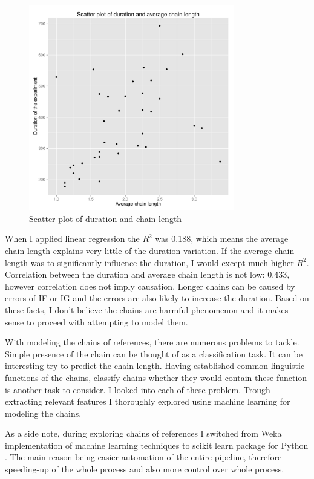 \begin{figure}[!htbp]
  \centering
	\includegraphics[width=0.8\textwidth]{Images/chains_duration_LR}
	\caption{Scatter plot of duration and chain length}
	\label{fig:chains_dur_scatter}
\end{figure}

When I applied linear regression the $R^2$ was 0.188, which means the average chain length explains very little of the duration variation. If the average chain length was to significantly influence the duration, I would except much higher $R^2$. Correlation between the duration and average chain length is not low: 0.433, however correlation does not imply causation. Longer chains can be caused by errors of IF or IG and the errors are also likely to increase the duration. Based on these facts, I don't believe the chains are harmful phenomenon and it makes sense to proceed with attempting to model them. 

With modeling the chains of references, there are numerous problems to tackle. Simple presence of the chain can be thought of as a classification task. It can be interesting try to predict the chain length. Having established common linguistic functions of the chains, classify chains whether they would contain these function is another task to consider. I looked into each of these problem. Trough extracting relevant features I thoroughly explored using machine learning for modeling the chains.

As a side note, during exploring chains of references I switched from Weka implementation of machine learning techniques \citep{hall2009weka} to scikit learn package for Python \citep{scikit-learn}. The main reason being easier automation of the entire pipeline, therefore speeding-up of the whole process and also more control over whole process.

